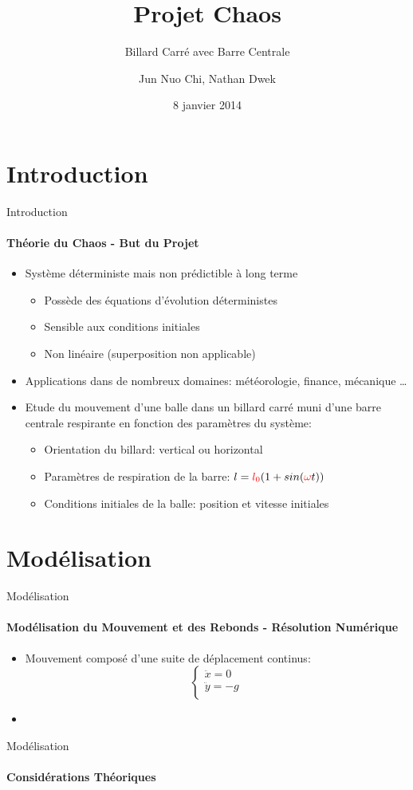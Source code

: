 \documentclass{beamer}
\title{Projet Chaos}
\subtitle{Billard Carré avec Barre Centrale}
\author[J. Chi, N. Dwek]{Jun Nuo Chi, Nathan Dwek}
\date{8 janvier 2014}
\begin{document}
  \frame{\titlepage}
  \section{Introduction}
  \begin{frame}{Introduction}
  \framesubtitle{Théorie du Chaos - But du Projet}
  \begin{itemize}
    \item Système déterministe mais non prédictible à long terme
    \begin{itemize}
      \item Possède des équations d'évolution déterministes
      \pause \item Sensible aux conditions initiales
      \item Non linéaire (superposition non applicable)
    \end{itemize}
    \pause \item Applications dans de nombreux domaines: météorologie, finance, mécanique \ldots
    \pause \item Etude du mouvement d'une balle dans un billard carré muni d'une barre centrale respirante en fonction des paramètres du système:
    \begin{itemize}
      \item Orientation du billard: vertical ou horizontal 
      \item Paramètres de respiration de la barre: \(l={\color{red}l_0}(1+sin({\color{red}\omega} t))\)
      \item Conditions initiales de la balle: position et vitesse initiales
    \end{itemize}
  \end{itemize}
  \end{frame}
  \section{Modélisation}
  \begin{frame}{Modélisation}
  \framesubtitle{Modélisation du Mouvement et des Rebonds - Résolution Numérique}
  \begin{itemize}
    \item Mouvement composé d'une suite de déplacement continus:\pause
    \begin{equation*}
      \begin{cases}
        \ddot{x}=0\\
        \ddot{y}=-g\\
      \end{cases}
    \end{equation*}
    \pause \item
  \end{itemize}

  \end{frame}
  \begin{frame}{Modélisation}
  \framesubtitle{Considérations Théoriques}  
  \end{frame}
\end{document}
